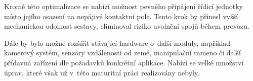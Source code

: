 \documentclass[12pt]{report}
\begin{document}
Kromě této optimalizace se nabízí možnost pevného připájení řídicí jednotky místo jejího osazení na nepájivé kontaktní pole. Tento krok by přinesl vyšší mechanickou odolnost sestavy, eliminoval riziko uvolnění spojů během provozu.

Dále by bylo možné rozšířit stávající hardware o~další moduly, například kamerový systém, senzory vzdálenosti od země, manipulační rameno či další přídavná zařízení dle požadavků konkrétní aplikace. Nabízí se velké množství úprav, které však už v~této maturitní práci realizovány nebyly.

\nocite{*}
\printbibliography					%
\printglossary[title={Zkratky}]		%
\listoffigures						%

\end{document}
